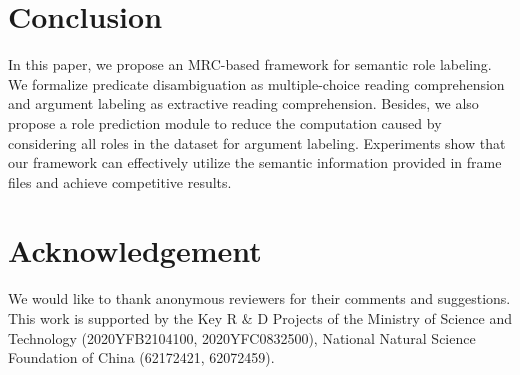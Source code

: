 \documentclass[11pt]{article}
\begin{document}
\section{Conclusion}
In this paper, we propose an MRC-based framework for semantic role labeling. We formalize predicate disambiguation as multiple-choice reading comprehension and argument labeling as extractive reading comprehension. Besides, we also propose a role prediction module to reduce the computation caused by considering all roles in the dataset for argument labeling.
Experiments show that our framework can effectively utilize the semantic information provided in frame files and achieve competitive results.


\section*{Acknowledgement}
We would like to thank anonymous reviewers for their comments and suggestions.
This work is supported by the Key R \& D Projects of the Ministry of Science and Technology (2020YFB2104100, 2020YFC0832500), National Natural
Science Foundation of China (62172421, 62072459).



\end{document}
